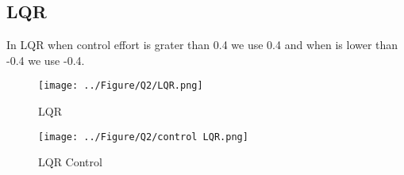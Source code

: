 \subsection{LQR}
In LQR when control effort is grater than 0.4 we use 0.4 and when is lower than -0.4 we use -0.4.
\begin{figure}[H]
	\caption{LQR}
	\centering
	\texttt{[image: ../Figure/Q2/LQR.png]}
\end{figure}
\begin{figure}[H]
	\caption{LQR Control}
	\centering
	\texttt{[image: ../Figure/Q2/control LQR.png]}
\end{figure}